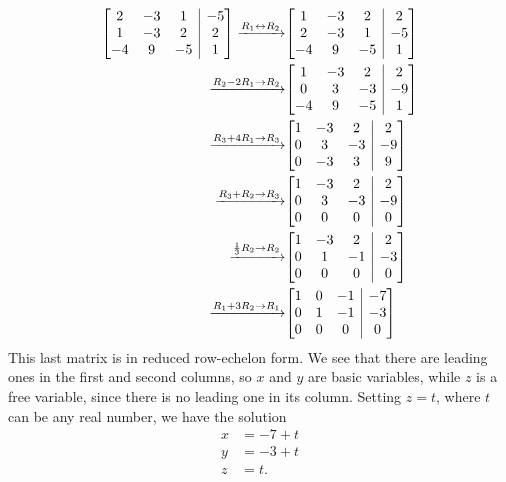 \documentclass[12pt]{article}
\makeatletter
\newenvironment{amatrix}[1]{%
  \left[\begin{array}{@{}*{#1}{c}|c@{}}
}{%
  \end{array}\right]
}
\newcommand{\bam}{\begin{amatrix}}
\newcommand{\eam}{\end{amatrix}}
\makeatother
\begin{document}
\begin{enumerate}
\begin{align*}
 \bam{3} 2&-3&1&-5\\1&-3&2&2\\-4&9&-5&1\eam \xrightarrow{R_1\leftrightarrow R_2} &\bam{3}1&-3&2&2\\2&-3&1&-5\\-4&9&-5&1\eam\\
\xrightarrow{R_2-2R_1\to R_2}&\bam{3}1&-3&2&2\\0&3&-3&-9\\-4&9&-5&1\eam\\
\xrightarrow{R_3+4R_1\to R_3}&\bam{3}1&-3&2&2\\0&3&-3&-9\\0&-3&3&9\eam\\
\xrightarrow{R_3+R_2\to R_3}&\bam{3}1&-3&2&2\\0&3&-3&-9\\0&0&0&0\eam\\
\xrightarrow{\frac{1}{3}R_2\to R_2}&\bam{3}1&-3&2&2\\0&1&-1&-3\\0&0&0&0\eam\\
\xrightarrow{R_1+3R_2\to R_1}&\bam{3}1&0&-1&-7\\0&1&-1&-3\\0&0&0&0\eam
\end{align*}
This last matrix is in reduced row-echelon form. We see that there are leading ones in the first and second columns, so $x$ and $y$ are basic variables, while $z$ is a free variable, since there is no leading one in its column. Setting $z=t$, where $t$ can be any real number, we have the solution
\begin{align*}
 x&=-7+t\\y&=-3+t\\z&=t.
\end{align*}
\end{enumerate}
\end{document}
